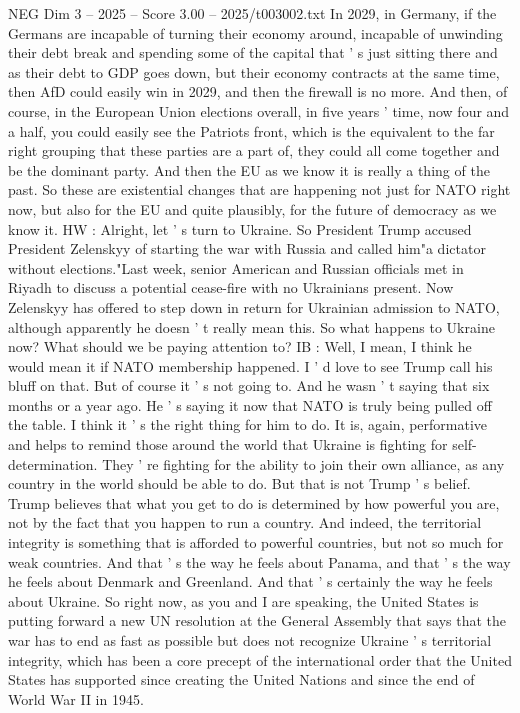 \begin{textsample}{NEG Dim 3 – 2025 – Score 3.00 – 2025/t003002.txt}
In 2029, in Germany, if the Germans are incapable of turning their economy around, incapable of unwinding their debt break and spending some of the capital that ' s just sitting there and as their debt to GDP goes down, but their economy contracts at the same time, then AfD could easily win in 2029, and then the firewall is no more.
And then, of course, in the European Union elections overall, in five years ' time, now four and a half, you could easily see the Patriots front, which is the equivalent to the far right grouping that these parties are a part of, they could all come together and be the dominant party.
And then the EU as we know it is really a thing of the past.
So these are existential changes that are happening not just for NATO right now, but also for the EU and quite plausibly, for the future of democracy as we know it.
HW : Alright, let ' s turn to Ukraine.
So President Trump accused President Zelenskyy of starting the war with Russia and called him"a dictator without elections."Last week, senior American and Russian officials met in Riyadh to discuss a potential cease-fire with no Ukrainians present.
Now Zelenskyy has offered to step down in return for Ukrainian admission to NATO, although apparently he doesn ' t really mean this.
So what happens to Ukraine now?
What should we be paying attention to?
IB : Well, I mean, I think he would mean it if NATO membership happened.
I ' d love to see Trump call his bluff on that.
But of course it ' s not going to.
And he wasn ' t saying that six months or a year ago.
He ' s saying it now that NATO is truly being pulled off the table.
I think it ' s the right thing for him to do.
It is, again, performative and helps to remind those around the world that Ukraine is fighting for self-determination.
They ' re fighting for the ability to join their own alliance, as any country in the world should be able to do.
But that is not Trump ' s belief.
Trump believes that what you get to do is determined by how powerful you are, not by the fact that you happen to run a country.
And indeed, the territorial integrity is something that is afforded to powerful countries, but not so much for weak countries.
And that ' s the way he feels about Panama, and that ' s the way he feels about Denmark and Greenland.
And that ' s certainly the way he feels about Ukraine.
So right now, as you and I are speaking, the United States is putting forward a new UN resolution at the General Assembly that says that the war has to end as fast as possible but does not recognize Ukraine ' s territorial integrity, which has been a core precept of the international order that the United States has supported since creating the United Nations and since the end of World War II in 1945.

\end{textsample}
